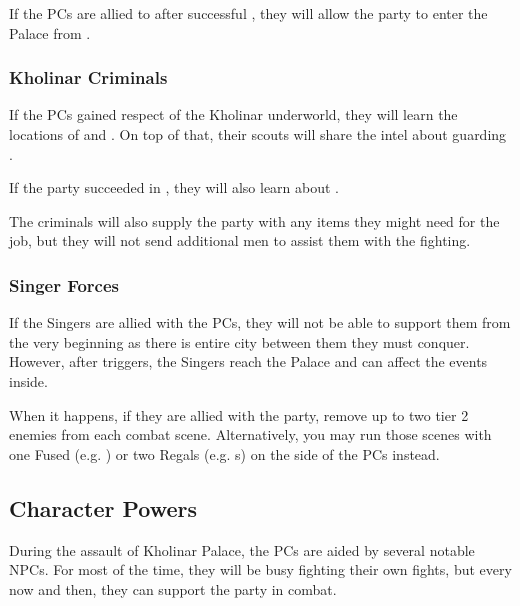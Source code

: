 If the PCs are allied to \npcFractionCult{} after successful , they will allow the party to enter the Palace from .

\subsubsection{Kholinar Criminals}

If the PCs gained respect of the Kholinar underworld, they will learn the locations of  and . On top of that, their scouts will share the intel about \enemyQueensShardbearer{} guarding \npcGavinor{}.
 
If the party succeeded in , they will also learn about .

The criminals will also supply the party with any items they might need for the job, but they will not send additional men to assist them with the fighting.

\subsubsection{Singer Forces}

If the Singers are allied with the PCs, they will not be able to support them from the very beginning as there is entire city between them they must conquer. However, after  triggers, the Singers reach the Palace and can affect the events inside. 

When it happens, if they are allied with the party, remove up to two tier 2 enemies from each combat scene. Alternatively, you may run those scenes with one Fused (e.g. \enemySingerHaevenlyOne{}) or two Regals (e.g. \enemySingerStormform{}s) on the side of the PCs instead.



\subsection{Character Powers}
\label{ssec:kholinarPalaceOpportunities}

During the assault of Kholinar Palace, the PCs are aided by several notable NPCs. For most of the time, they will be busy fighting their own fights, but every now and then, they can support the party in combat.

